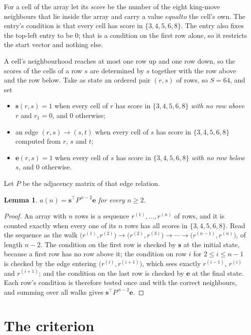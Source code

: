 \documentclass[11pt,a4paper]{article}
\theoremstyle{plain}
\newtheorem{lemma}[theorem]{Lemma}
\theoremstyle{definition}
\begin{document}
For a cell of the array let its \emph{score} be the number of the eight king-move neighbours that lie inside
the array and carry a value $equal to$ the cell's own. The entry's condition is that every cell
has score in $\{3,4,5,6,8\}$. The entry also fixes the top-left entry to be $0$; that is a condition on the first row alone, so it restricts the start vector and nothing else.

A cell's neighbourhood reaches at most one row up and one row down, so the scores of the
cells of a row $s$ are determined by $s$ together with the row above and the row below.
Take as state an ordered pair $(r,s)$ of rows, so $S=64$, and set
\begin{itemize}
\item $\mathbf{s}(r,s)=1$ when every cell of $r$ has score in $\{3,4,5,6,8\}$ \emph{with no row
above $r$} and $r_1=0$, and $0$ otherwise;
\item an edge $(r,s)\to(s,t)$ when every cell of $s$ has score in $\{3,4,5,6,8\}$ computed from
$r$, $s$ and $t$;
\item $\mathbf{e}(r,s)=1$ when every cell of $s$ has score in $\{3,4,5,6,8\}$ \emph{with no row
below $s$}, and $0$ otherwise.
\end{itemize}
Let $P$ be the adjacency matrix of that edge relation.

\begin{lemma}\label{lem:walk}
$a(n)=\mathbf{s}^{\!\top}P^{\,n-2}\mathbf{e}$ for every $n\ge2$.
\end{lemma}

\begin{proof}
An array with $n$ rows is a sequence $r^{(1)},\dots,r^{(n)}$ of rows, and it is counted
exactly when every one of its $n$ rows has all scores in $\{3,4,5,6,8\}$. Read the sequence as the
walk $\bigl(r^{(1)},r^{(2)}\bigr)\to\bigl(r^{(2)},r^{(3)}\bigr)\to\cdots\to
\bigl(r^{(n-1)},r^{(n)}\bigr)$, of length $n-2$. The condition on the first row is
checked by $\mathbf{s}$ at the initial state, because a first row has no row above it; the
condition on row $i$ for $2\le i\le n-1$ is checked by the edge entering
$\bigl(r^{(i)},r^{(i+1)}\bigr)$, which sees exactly $r^{(i-1)}$, $r^{(i)}$ and
$r^{(i+1)}$; and the condition on the last row is checked by $\mathbf{e}$ at the final
state. Each row's condition is therefore tested once and with the correct neighbours, and
summing over all walks gives $\mathbf{s}^{\!\top}P^{\,n-2}\mathbf{e}$.
\end{proof}

\section{The criterion}
\end{document}
